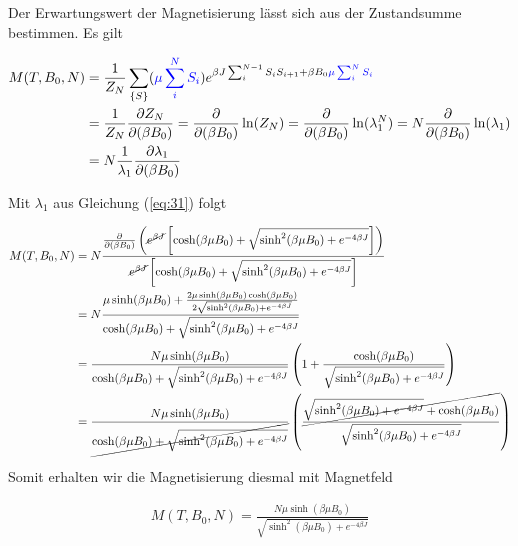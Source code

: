 Der Erwartungswert der Magnetisierung lässt sich aus der Zustandsumme bestimmen. Es gilt

\begin{align}
  \label{eq:34}
  M(T,B_0,N) &= \frac{1}{Z_N}  \sum_{\{S\}} (\textcolor{blue}{\mu \sum_i^N S_i} )  e^{\beta J \sum_{i}^{N-1} S_iS_{i+1} + \beta B_0 \textcolor{blue}{\mu \sum_i^N S_i} } \notag \\
&=  \frac{1}{Z_N} \frac{\partial Z_N}{\partial (\beta B_0)} =  \frac{\partial}{\partial (\beta B_0)}\ln(Z_N) = \frac{\partial}{\partial (\beta B_0)}\ln(\lambda_1^N) = N \frac{\partial}{\partial (\beta B_0)}\ln(\lambda_1) \notag\\
&= N \frac{1}{\lambda_1} \frac{\partial \lambda_1}{\partial (\beta B_0)}
\end{align}

Mit \(\lambda_1\) aus Gleichung (\ref{eq:31}) folgt

\begin{align}
  \label{eq:35}
  M(T,B_0,N) &= N\frac{ \pdiff_{(\beta B_0)}\left( \cancel{e^{\beta J}}\left[\cosh(\beta \mu B_0) + \sqrt{\sinh^2(\beta \mu B_0) + e^{-4\beta J}   } \right] \right) } 
{\cancel{e^{\beta J}}\left[\cosh(\beta \mu B_0) + \sqrt{\sinh^2(\beta \mu B_0) + e^{-4\beta J}   } \right] } \notag\\
&= N \frac{ \mu \sinh(\beta \mu B_0) + \frac{2\mu\sinh(\beta \mu B_0)\cosh(\beta \mu B_0) }{2 \sqrt{\sinh^2(\beta \mu B_0) + e^{-4\beta J}   }}  } 
{\cosh(\beta \mu B_0) + \sqrt{\sinh^2(\beta \mu B_0) + e^{-4\beta J}   }  } \notag\\
&=\frac{ N \mu \sinh(\beta \mu B_0)}{ \cosh(\beta \mu B_0) + \sqrt{\sinh^2(\beta \mu B_0) + e^{-4\beta J}   }  } \left( 1  + \frac{\cosh(\beta \mu B_0) }{\sqrt{\sinh^2(\beta \mu B_0) + e^{-4\beta J}   }}  \right) \notag\\
&=\frac{ N \mu \sinh(\beta \mu B_0)}{ \cancel{\cosh(\beta \mu B_0) + \sqrt{\sinh^2(\beta \mu B_0) + e^{-4\beta J}   } } } \left( \frac{\cancel{\sqrt{\sinh^2(\beta \mu B_0) + e^{-4\beta J}   }+\cosh(\beta \mu B_0)} }{\sqrt{\sinh^2(\beta \mu B_0) + e^{-4\beta J}   }}   \right)
\end{align}

Somit erhalten wir die Magnetisierung diesmal mit Magnetfeld

\begin{align}
  \label{eq:37}
 \boxed{ M(T,B_0,N)  =\frac{ N \mu \sinh(\beta \mu B_0)}{\sqrt{\sinh^2(\beta \mu B_0) + e^{-4\beta J}   }} }
\end{align}


